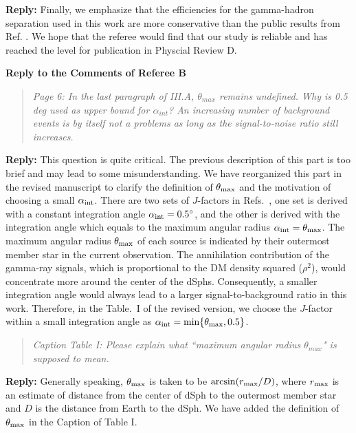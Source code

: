 \documentclass{article}
\begin{document}
\textbf{Reply:} Finally, we emphasize that the efficiencies for the gamma-hadron separation used in this work are more conservative than the public results from Ref. \cite{Zha:2017vcs}. We hope that the referee would find that our study is reliable and has reached the level for publication in Physcial Review D.

\vskip 1.5cm


\begin{center}
\textbf{\large Reply to the Comments of Referee B}
\end{center}


\begin{quote}
\emph{Page 6: In the last paragraph of III.A, $\theta_{max}$ remains undefined. Why is 0.5 deg used as upper bound for $\alpha_{int}$? An increasing number of background events is by itself not a problems as long as the signal-to-noise ratio still increases.}
\end{quote}

\textbf{Reply:}
This question is quite critical.
The previous description of this part is too brief and may lead to some misunderstanding.
We have reorganized this part in the revised manuscript to clarify the definition of $\theta_{\rm max}$ and the motivation of choosing a small $\alpha_{\rm int}$.
There are two sets of $J$-factors in Refs.~\cite{Geringer-Sameth:2014yza,Hutten:2016jko}, one set is derived with a constant integration angle $\alpha_{\rm int}=0.5^\circ$, and the other is derived with the integration angle which equals to the maximum angular radius $\alpha_{\rm int}=\theta_{\rm max}$.
The maximum angular radius $\theta_{\rm max}$ of each source is indicated by their outermost member star in the current observation.
The annihilation contribution of the gamma-ray signals, which is proportional to the DM density squared ($\rho^2$), would concentrate more around the center of the dSphs. Consequently, a smaller integration angle would always lead to a larger signal-to-background ratio in this work.
Therefore, in the Table.~I of the revised version, we choose the $J$-factor within a small integration angle as $\alpha_{\rm int}=\min\{\theta_{\rm max},0.5\}$.


\vskip 0.5cm
\begin{quote}
\emph{Caption Table I: Please explain what ``maximum angular radius $\theta_{max}$" is supposed to mean.}
\end{quote}

\textbf{Reply:} Generally speaking, $\theta_{\rm max}$ is taken to be ${\rm arcsin}(r_{\rm max}/D)$, where $r_{\rm max}$ is an estimate of distance from the center of dSph to the outermost member star and $D$ is the distance from Earth to the dSph. We have added the definition of $\theta_{\rm max}$ in the Caption of Table I.
\end{document}
